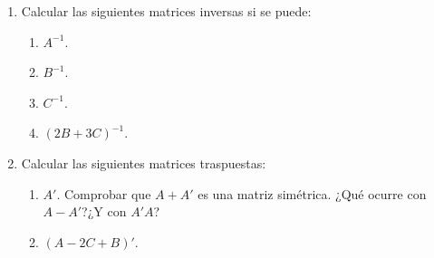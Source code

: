 \documentclass[a4paper]{article}
\begin{document}
\begin{enumerate}[leftmargin=*]
\begin{enumerate}
\item Calcular las siguientes matrices inversas si se puede:
\begin{enumerate}
\item $A^{-1}$.
\item $B^{-1}$.
\item $C^{-1}$.
\item $(2B+3C)^{-1}$.
\end{enumerate}

\item Calcular las siguientes matrices traspuestas:
\begin{enumerate}
\item $A'$. Comprobar que $A+A'$ es una matriz simétrica. ¿Qué ocurre con $A-A'$?¿Y con $A'A$?
\item $(A-2C+B)'$.
\end{enumerate}
\end{enumerate}
\end{enumerate}
\end{document}
